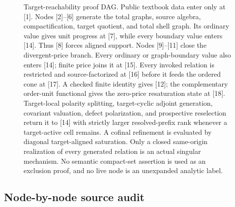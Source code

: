 \documentclass[11pt]{article}
\numberwithin{section}{part}
\theoremstyle{plain}
\theoremstyle{definition}
\theoremstyle{remark}
\begin{document}
\begin{figure}[tbp]
{%
}
\caption{Target-reachability proof DAG.  Public textbook data enter only at [1].  Nodes
[2]--[6] generate the total graphs, source algebra, compactification, target
quotient, and total shell graph.  Its ordinary value gives unit progress at
[7], while every boundary value enters [14].  Thus [8]
forces aligned support.  Nodes [9]--[11] close the divergent-price branch.
Every ordinary or graph-boundary value also enters [14]; finite price joins it
at [15].  Every invoked relation is restricted and source-factorized at [16]
before it feeds the ordered cone at
[17].  A checked finite identity gives [12]; the complementary order-unit
functional gives the zero-price resaturation state at [18].  Target-local
polarity splitting, target-cyclic adjoint generation, covariant valuation,
defect polarization, and prospective reselection return it to [14] with
strictly larger resolved-prefix rank whenever a target-active cell remains.
A cofinal refinement is evaluated by diagonal target-aligned saturation.
Only a closed same-origin realization of every generated relation is an
actual singular mechanism.  No semantic compact-set assertion is used as
an exclusion proof, and no live node is an unexpanded analytic label.}
\label{fig:target-local-physical-proof}
\end{figure}

\subsection*{Node-by-node source audit}
\end{document}
